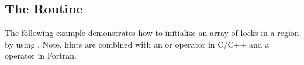 \pagebreak
\subsection{The  Routine}
\label{subsec:init_lock_with_hint}

The following example demonstrates how to initialize an array of locks in a  region by using .
Note, hints are combined with an \code{|} or \code{+} operator in C/C++ and a \code{+} operator in Fortran.


